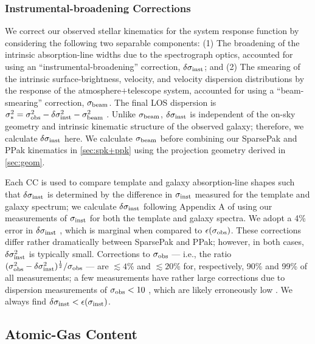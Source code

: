 \documentclass[apj,iop,numberedappendix]{emulateapj}
\begin{document}
\subsubsection{Instrumental-broadening Corrections}
\label{sec:sinst}

We correct our observed stellar kinematics for the system response function by
considering the following two separable components: (1) The broadening of the
intrinsic absorption-line widths due to the spectrograph optics, accounted for
using an ``instrumental-broadening'' correction, $\delta\sigma_{\rm inst}$; and (2) The
smearing of the intrinsic surface-brightness, velocity, and velocity dispersion
distributions by the response of the atmosphere$+$telescope system, accounted
for using a ``beam-smearing'' correction, $\sigma_{\rm beam}$.  The final LOS dispersion is
$\sigma_{\ast}^2 = \sigma_{\rm obs}^2 - \delta\sigma_{\rm inst}^2 - \sigma_{\rm beam}^2$ .
Unlike $\sigma_{\rm beam}$, $\delta\sigma_{\rm inst}$ is independent of the on-sky geometry and
intrinsic kinematic structure of the observed galaxy; therefore, we calculate
$\delta\sigma_{\rm inst}$ here.  We calculate $\sigma_{\rm beam}$ before combining our SparsePak and
PPak kinematics in \sect \ref{sec:spk+ppk} using the projection geometry derived
in \sect \ref{sec:geom}.

Each CC is used to compare template and galaxy absorption-line shapes such that
$\delta\sigma_{\rm inst}$ is determined by the difference in $\sigma_{\rm inst}$ measured for the
template and galaxy spectrum; we calculate $\delta\sigma_{\rm inst}$ following Appendix A
of  using our measurements of $\sigma_{\rm inst}$ for both
the template and galaxy spectra.  We adopt a 4\% error in $\delta\sigma_{\rm inst}$
, which is marginal when compared to
$\epsilon(\sigma_{\rm obs})$.  These corrections differ rather dramatically between
SparsePak and PPak; however, in both cases, $\delta\sigma_{\rm inst}^2$ is typically small.
Corrections to $\sigma_{\rm obs}$ --- i.e., the ratio $(\sigma_{\rm obs}^2 -
\delta\sigma_{\rm inst}^2)^{\frac{1}{2}} / \sigma_{\rm obs}$ --- are $\lesssim4$\% and $\lesssim20$\%
for, respectively, 90\% and 99\% of all measurements; a few measurements have
rather large corrections due to dispersion measurements of $\sigma_{\rm obs} < 10$ \kms,
which are likely erroneously low .  We always
find $\delta\sigma_{\rm inst} < \epsilon(\sigma_{\rm inst})$.

\subsection{Atomic-Gas Content}
\label{sec:vla}
\end{document}
